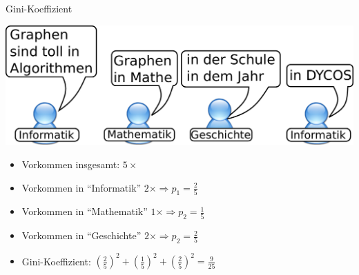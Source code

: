 \begin{frame}{Gini-Koeffizient}
    \begin{center}
        \includegraphics[width=\textwidth,height=0.4\textheight,keepaspectratio]{../images/gini-example.pdf}
    \end{center}

    \begin{itemize}
        \item<3-> Vorkommen insgesamt: $5 \times$
        \item<4-> Vorkommen in \enquote{Informatik} $2\times \Rightarrow p_1 = \frac{2}{5}$
        \item<5-> Vorkommen in \enquote{Mathematik} $1\times \Rightarrow p_2 = \frac{1}{5}$
        \item<6-> Vorkommen in \enquote{Geschichte} $2\times \Rightarrow p_2 = \frac{2}{5}$
        \item<7-> Gini-Koeffizient: $\left (\frac{2}{5} \right )^2 + \left (\frac{1}{5} \right )^2 + \left (\frac{2}{5} \right )^2 = \frac{9}{25}$
    \end{itemize}
\end{frame}
